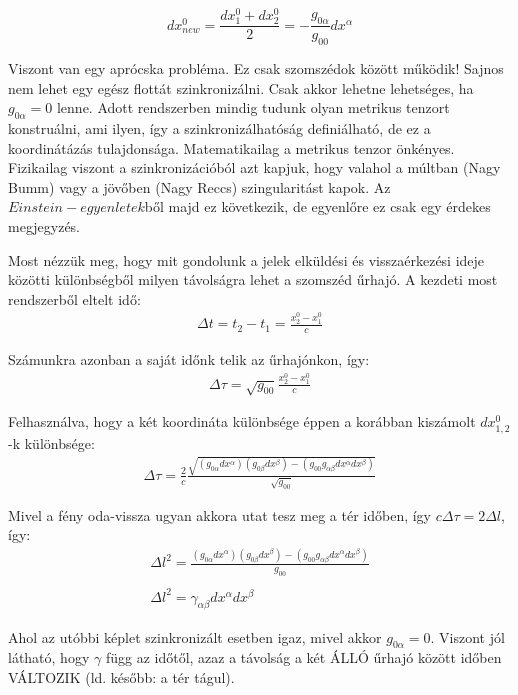 \documentclass[a4paper, 12pt]{article}
\begin{document}
\begin{equation}
    dx^{0}_{new} = \frac{dx_{1}^{0} + dx_2^{0}}{2} = -\frac{g_{0\alpha}}{g_{00}}dx^{\alpha}
\end{equation}
\par Viszont van egy aprócska probléma. Ez csak szomszédok között működik! Sajnos nem lehet egy egész flottát szinkronizálni. Csak akkor lehetne lehetséges, ha $g_{0\alpha} = 0$ lenne. Adott rendszerben mindig tudunk olyan metrikus tenzort konstruálni, ami ilyen, így a szinkronizálhatóság definiálható, de ez a koordinátázás tulajdonsága. Matematikailag a metrikus tenzor önkényes. Fizikailag viszont a szinkronizációból azt kapjuk, hogy valahol a múltban (Nagy Bumm) vagy a jövőben  (Nagy Reccs) szingularitást kapok. Az $Einstein-egyenletek$ből majd ez következik, de egyenlőre ez csak egy érdekes megjegyzés.
\par Most nézzük meg, hogy mit gondolunk a jelek elküldési és visszaérkezési ideje közötti különbségből milyen távolságra lehet a szomszéd űrhajó. A kezdeti most rendszerből eltelt idő:
\begin{gather*}
    \Delta t = t_{2} - t_{1} = \frac{x^{0}_{2} - x^{0}_{1}}{c}
\end{gather*}
\par Számunkra azonban a saját időnk telik az űrhajónkon, így:
\begin{gather*}
    \Delta \tau = \sqrt{g_{00}}\frac{x^{0}_{2} - x^{0}_{1}}{c}
\end{gather*}
\par Felhasználva, hogy a két koordináta különbsége éppen a korábban kiszámolt $dx_{1,2}^{0}$-k különbsége:
\begin{gather*}
    \Delta \tau = \frac{2}{c}\frac{\sqrt{(g_{0\alpha}dx^{\alpha})(g_{0\beta}dx^{\beta})-(g_{00}g_{\alpha\beta}dx^{\alpha}dx^{\beta})}}{\sqrt{g_{00}}}
\end{gather*}
\par Mivel a fény oda-vissza ugyan akkora utat tesz meg a tér időben, így $c\Delta\tau = 2\Delta l$, így:
\begin{gather*}
    \Delta l^{2} = \frac{(g_{0\alpha}dx^{\alpha})(g_{0\beta}dx^{\beta})-(g_{00}g_{\alpha\beta}dx^{\alpha}dx^{\beta})}{g_{00}} \\ \\
    \Delta l^{2} = \gamma_{\alpha\beta}dx^{\alpha}dx^{\beta}
\end{gather*}
\par Ahol az utóbbi képlet szinkronizált esetben igaz, mivel akkor $g_{0\alpha} = 0$. Viszont jól látható, hogy $\gamma$ függ az időtől, azaz a távolság a két ÁLLÓ űrhajó között időben VÁLTOZIK (ld. később: a tér tágul). 
\end{document}

